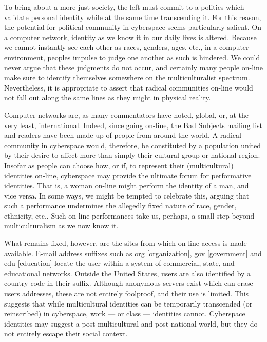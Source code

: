 \documentclass[letterpaper,12pt,english]{sphinxmanual}
\begin{document}
To bring about a more just society, the left must commit to a politics which validate personal identity while at the same time transcending it. For this reason, the potential for political community in cyberspace seems particularly salient. On a computer network, identity as we know it in our daily lives is altered. Because we cannot instantly see each other as races, genders, ages, etc., in a computer environment, peoples impulse to judge one another as such is hindered. We could never argue that these judgments do not occur, and certainly many people on-line make sure to identify themselves somewhere on the multiculturalist spectrum. Nevertheless, it is appropriate to assert that radical communities on-line would not fall out along the same lines as they might in physical reality.

Computer networks are, as many commentators have noted, global, or, at the very least, international. Indeed, since going on-line, the Bad Subjects mailing list and readers have been made up of people from around the world. A radical community in cyberspace would, therefore, be constituted by a population united by their desire to affect more than simply their cultural group or national region. Insofar as people can choose how, or if, to represent their (multicultural) identities on-line, cyberspace may provide the ultimate forum for performative identities. That is, a woman on-line might perform the identity of a man, and vice versa. In some ways, we might be tempted to celebrate this, arguing that such a performance undermines the allegedly fixed nature of race, gender, ethnicity, etc.. Such on-line performances take us, perhaps, a small step beyond multiculturalism as we now know it.

What remains fixed, however, are the sites from which on-line access is made available. E-mail address suffixes such as org {[}organization{]}, gov {[}government{]} and edu {[}education{]} locate the user within a system of commercial, state, and educational networks. Outside the United States, users are also identified by a country code in their suffix. Although anonymous servers exist which can erase users addresses, these are not entirely foolproof, and their use is limited. This suggests that while multicultural identities can be temporarily transcended (or reinscribed) in cyberspace, work — or class — identities cannot. Cyberspace identities may suggest a post-multicultural and post-national world, but they do not entirely escape their social context.
\end{document}
